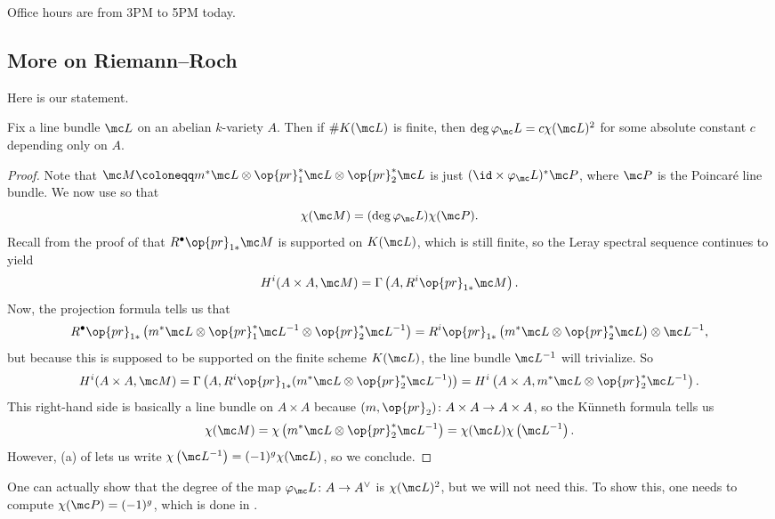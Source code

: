 \documentclass[../notes.tex]{subfiles}
\begin{document}
Office hours are from 3PM to 5PM today.

\subsection{More on Riemann--Roch}
Here is our statement.
\begin{proposition}
	Fix a line bundle $\mc L$ on an abelian $k$-variety $A$. Then if $\#K(\mc L)$ is finite, then $\deg\varphi_\mc L=c\chi(\mc L)^2$ for some absolute constant $c$ depending only on $A$.
\end{proposition}
\begin{proof}
	Note that $\mc M\coloneqq m^*\mc L\otimes\op{pr}_1^*\mc L\otimes\op{pr}_2^*\mc L$ is just $({\id}\times\varphi_\mc L)^*\mc P$, where $\mc P$ is the Poincar\'e line bundle. We now use  so that
	\[\chi(\mc M)=(\deg\varphi_\mc L)\chi(\mc P).\]
	Recall from the proof of  that $R^\bullet\op{pr}_{1*}\mc M$ is supported on $K(\mc L)$, which is still finite, so the Leray spectral sequence continues to yield
	\[H^i(A\times A,\mc M)=\Gamma\left(A,R^i\op{pr}_{1*}\mc M\right).\]
	Now, the projection formula tells us that
	\[R^\bullet\op{pr}_{1*}\left(m^*\mc L\otimes\op{pr}_1^*\mc L^{-1}\otimes\op{pr}_2^*\mc L^{-1}\right)=R^i\op{pr}_{1*}\left(m^*\mc L\otimes\op{pr}_2^*\mc L\right)\otimes\mc L^{-1},\]
	but because this is supposed to be supported on the finite scheme $K(\mc L)$, the line bundle $\mc L^{-1}$ will trivialize. So
	\[H^i(A\times A,\mc M)=\Gamma\left(A,R^i\op{pr}_{1*}(m^*\mc L\otimes\op{pr}_{2}^*\mc L^{-1})\right)=H^i\left(A\times A,m^*\mc L\otimes\op{pr}_2^*\mc L^{-1}\right).\]
	This right-hand side is basically a line bundle on $A\times A$ because $(m,{\op{pr}_2})\colon A\times A\to A\times A$, so the K\"unneth formula tells us
	\[\chi(\mc M)=\chi\left(m^*\mc L\otimes\op{pr}_2^*\mc L^{-1}\right)=\chi(\mc L)\chi\left(\mc L^{-1}\right).\]
	However, (a) of  lets us write $\chi\left(\mc L^{-1}\right)=(-1)^g\chi(\mc L)$, so we conclude.
\end{proof}
\begin{remark}
	One can actually show that the degree of the map $\varphi_\mc L\colon A\to A^\lor$ is $\chi(\mc L)^2$, but we will not need this. To show this, one needs to compute $\chi(\mc P)=(-1)^g$, which is done in \cite[Part~III]{mumford}.
\end{remark}
\end{document}

